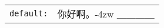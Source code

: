 \documentclass{utarticle}
\def\kenten#1{\texttt{#1:}&{你好啊。\kern-4zw ＿＿＿＿}}
\begin{document}
\begin{tabular}{ll}
\kenten{default}\\
\end{tabular}
\end{document}
